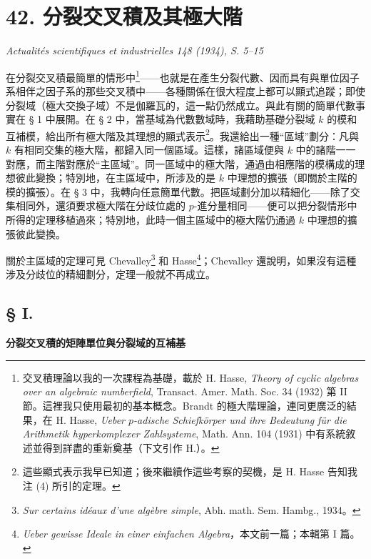 \documentclass[11pt]{article}
\begin{document}
\setcounter{footnote}{0}

\section*{42. 分裂交叉積及其極大階}

\begin{center}
\emph{Actualités scientifiques et industrielles 148 (1934), S. 5--15}
\end{center}

在分裂交叉積最簡單的情形中\footnote{交叉積理論以我的一次課程為基礎，載於 H. Hasse, \emph{Theory of cyclic algebras over an algebraic numberfield}, Transact. Amer. Math. Soc. 34 (1932) 第 II 節。這裡我只使用最初的基本概念。Brandt 的極大階理論，連同更廣泛的結果，在 H. Hasse, \emph{Ueber \(p\)-adische Schiefkörper und ihre Bedeutung für die Arithmetik hyperkomplexer Zahlsysteme}, Math. Ann. 104 (1931) 中有系統敘述並得到詳盡的重新奠基（下文引作 H.）。}——也就是在產生分裂代數、因而具有與單位因子系相伴之因子系的那些交叉積中——各種關係在很大程度上都可以顯式追蹤；即使分裂域（極大交換子域）不是伽羅瓦的，這一點仍然成立。與此有關的簡單代數事實在 § 1 中展開。在 § 2 中，當基域為代數數域時，我藉助基礎分裂域 \(k\) 的模和互補模，給出所有極大階及其理想的顯式表示\footnote{這些顯式表示我早已知道；後來繼續作這些考察的契機，是 H. Hasse 告知我注 (4) 所引的定理。}。我還給出一種“區域”劃分：凡與 \(k\) 有相同交集的極大階，都歸入同一個區域。這樣，諸區域便與 \(k\) 中的諸階一一對應，而主階對應於“主區域”。同一區域中的極大階，通過由相應階的模構成的理想彼此變換；特別地，在主區域中，所涉及的是 \(k\) 中理想的擴張（即關於主階的模的擴張）。在 § 3 中，我轉向任意簡單代數。把區域劃分加以精細化——除了交集相同外，還須要求極大階在分歧位處的 \(p\)-進分量相同——便可以把分裂情形中所得的定理移植過來；特別地，此時一個主區域中的極大階仍通過 \(k\) 中理想的擴張彼此變換。

關於主區域的定理可見 Chevalley\footnote{\emph{Sur certains idéaux d'une algèbre simple}, Abh. math. Sem. Hambg., 1934。} 和 Hasse\footnote{\emph{Ueber gewisse Ideale in einer einfachen Algebra}，本文前一篇；本輯第 I 篇。}；Chevalley 還說明，如果沒有這種涉及分歧位的精細劃分，定理一般就不再成立。

\subsection*{§ I.}
\begin{center}
\textbf{分裂交叉積的矩陣單位與分裂域的互補基}
\end{center}
\end{document}
